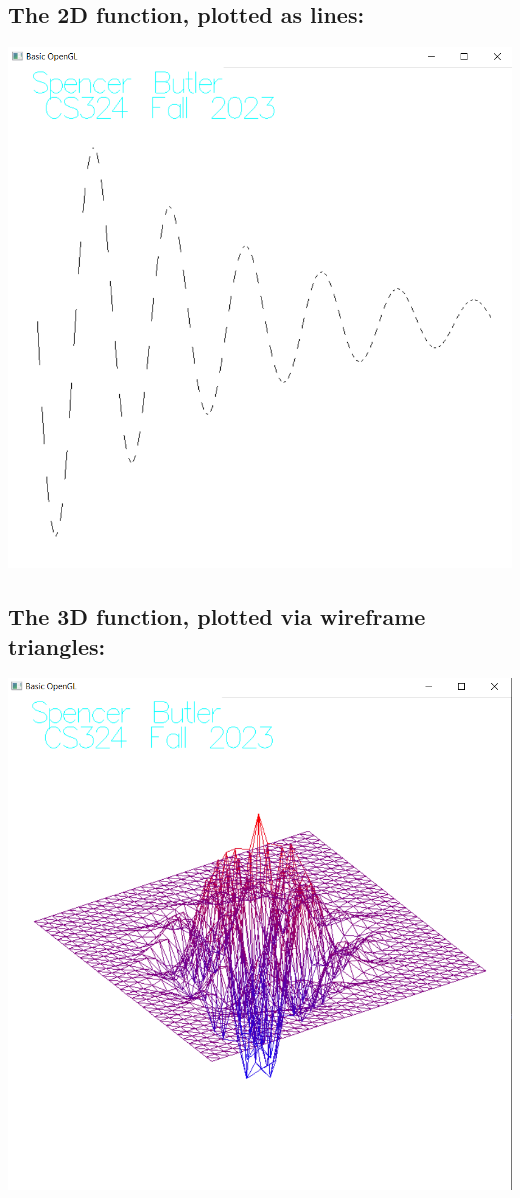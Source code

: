\documentclass[12pt]{article}
\begin{document}
\subsection{The 2D function, plotted as lines:}
\noindent \includegraphics{screens/lines}
\subsection{The 3D function, plotted via wireframe triangles:}
\noindent \includegraphics{screens/tris}
\end{document}
